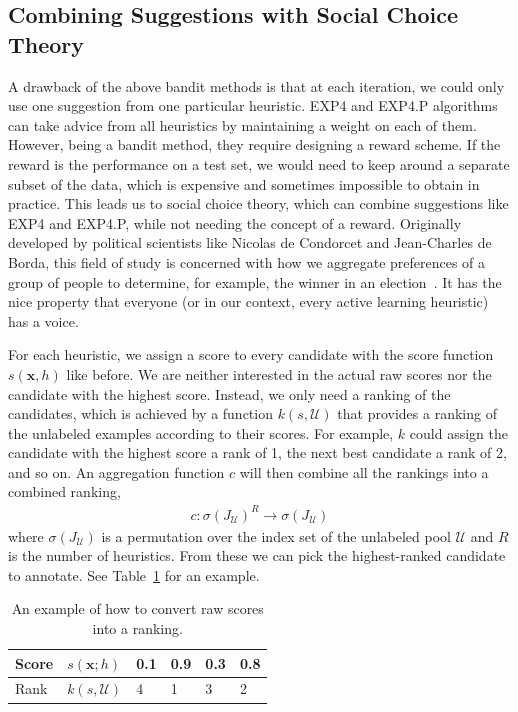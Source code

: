 \documentclass[fleqn,10pt,lineno]{wlpeerj} %
\newcommand{\Unlabeled}{\mathcal{U}}
\begin{document}
\subsection{Combining Suggestions with Social Choice Theory}

A drawback of the above bandit methods is that at each iteration, we could only
use one suggestion from one particular heuristic. EXP4 and EXP4.P algorithms
can take advice from all heuristics by maintaining a weight on each of them.
However, being a bandit method, they require designing a reward scheme. If the
reward is the performance on a test set, we would need to keep around a
separate subset of the data, which is expensive and sometimes impossible to
obtain in practice.  This leads us to social choice theory, which can combine
suggestions like EXP4 and EXP4.P, while not needing the concept of a reward.
Originally developed by political scientists like Nicolas de Condorcet and
Jean-Charles de Borda, this field of study is concerned with how we aggregate
preferences of a group of people to determine, for example, the winner in an
election~\citep{list13}. It has the nice property that everyone (or in our
context, every active learning heuristic) has a voice.

For each heuristic, we assign a score to every candidate with the score
function $s(\bm{x}, h)$ like before. We are neither interested in the actual
raw scores nor the candidate with the highest score. Instead, we only need a
ranking of the candidates, which is achieved by a function $k(s, \Unlabeled)$
that provides a ranking of the unlabeled examples according to their scores.
For example, $k$ could assign the candidate with the highest score a rank of 1,
the next best candidate a rank of 2, and so on. An aggregation function $c$
will then combine all the rankings into a combined ranking,
    \begin{align}
		c : \sigma(J_\Unlabeled)^{R} \rightarrow \sigma(J_\Unlabeled)
	\end{align}
where $\sigma(J_\Unlabeled)$ is a permutation over the index set of the
unlabeled pool $\Unlabeled$ and $R$ is the number of heuristics. From these we
can pick the highest-ranked candidate to annotate. See Table~\ref{tab:rank}
for an example.

\begin{table}[htbp]
	\caption {An example of how to convert raw scores into a ranking.}
	          \label{tab:rank}
	\centering
	\begin{tabular}{llllll}
		\toprule
		Score & $s(\bm{x}; h)$  &  0.1 & 0.9 & 0.3 & 0.8 \\
		\midrule
		Rank & $k(s, \Unlabeled)$ & 4 & 1 & 3 & 2 \\
		\bottomrule
	\end{tabular}
\end{table}
\end{document}
